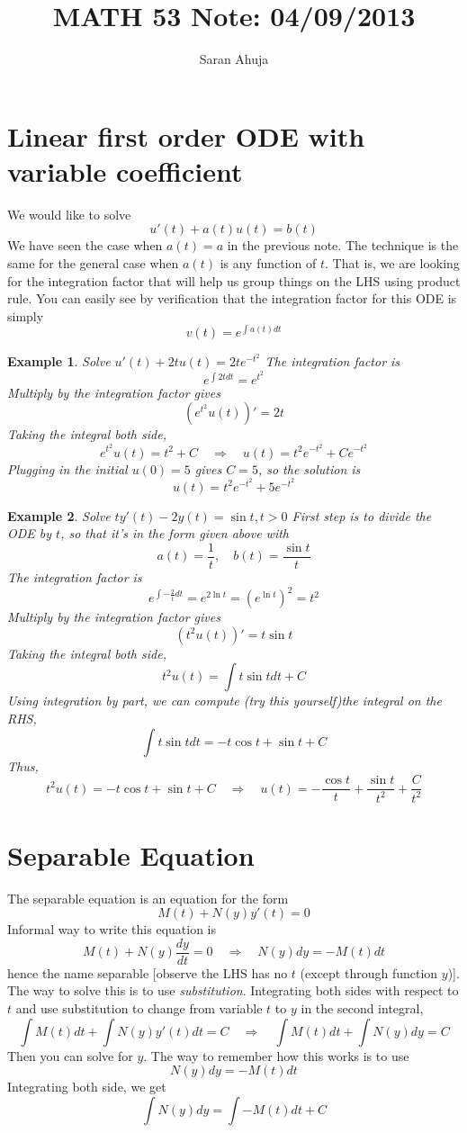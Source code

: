 \documentclass[10pt]{amsart}
\title{MATH 53 Note: 04/09/2013}
\author{Saran Ahuja}
\newtheorem{example}{Example}
\renewcommand{\ni}{\noindent}
\renewcommand{\l}{\left}
\renewcommand{\r}{\right}
\newcommand{\imply}{ \quad \Rightarrow \quad}
\begin{document}
\maketitle
\section{Linear first order ODE with variable coefficient}

\ni We would like to solve
$$ u'(t) + a(t)u(t) = b(t) $$
We have seen the case when $a(t) = a$ in the previous note. The technique is the same for the general case when $a(t)$ is any function of $t$. That is, we are looking for the integration factor that will help us group things on the LHS using product rule. You can easily see by verification that the integration factor for this ODE is simply
$$ v(t) = e^{\int a(t) dt} $$


\begin{example} Solve $u'(t) + 2tu(t) = 2t e^{-t^{2}}$
The integration factor is
$$ e^{\int 2t dt } = e^{t^{2}} $$
Multiply by the integration factor gives
$$ \l(e^{t^{2}}u(t)\r)' = 2t $$
Taking the integral both side,
$$ e^{t^{2}}u(t) = t^{2}+C \imply u(t) = t^{2}e^{-t^{2}}+Ce^{-t^{2}} $$
Plugging in the initial $u(0) = 5$ gives $C = 5$, so the solution is
$$ u(t) = t^{2}e^{-t^{2}}+5e^{-t^{2}} $$
\end{example}


\begin{example} Solve $ty'(t) - 2y(t) = \sin t,  t>0$
First step is to divide the ODE by $t$, so that it's in the form given above with 
$$ a(t) = \frac{1}{t}, \quad b(t) = \frac{\sin t}{t} $$
The integration factor is
$$ e^{\int -\frac{2}{t} dt } = e^{2\ln t} = (e^{\ln t})^{2} = t^{2} $$
Multiply by the integration factor gives
$$ \l(t^{2}u(t)\r)' = t \sin t $$
Taking the integral both side,
$$ t^{2}u(t) = \int t \sin t dt + C $$
Using integration by part, we can compute (try this yourself)the integral on the RHS,
$$ \int t\sin t dt = -t \cos t + \sin t + C $$
Thus,
$$ t^{2}u(t) =  -t \cos t + \sin t + C \imply u(t) = - \frac{\cos t}{t} + \frac{\sin t}{t^{2}} + \frac{C}{t^{2}} $$

\end{example} 

\section{ Separable Equation}

\ni The separable equation is an equation for the form 
$$ M(t) + N(y)y'(t) = 0 $$
Informal way to write this equation is
$$ M(t) + N(y)\frac{dy}{dt} = 0 \quad \Rightarrow \quad N(y)dy = - M(t)dt $$
hence the name separable [observe the LHS has no $t$ (except through function $y$)]. The way to solve this is to use \textit{substitution}.  Integrating both sides with respect to $t$ and use substitution to change from variable $t$ to $y$ in the second integral, 
$$ \int M(t) dt + \int N(y)y'(t)dt = C \quad \Rightarrow \quad \int M(t)dt  + \int N(y)dy = C $$
Then you can solve for $y$. The way to remember how this works is to use
$$ N(y) dy = - M(t) dt $$
Integrating both side, we get
$$ \int N(y) dy = \int -M(t) dt + C $$
\end{document}
